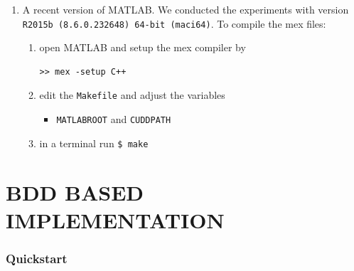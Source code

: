 \documentclass[a4paper]{amsart}
\begin{document}
\begin{enumerate}
  \item A recent version of MATLAB. We conducted
  the experiments with version {\tt \small R2015b (8.6.0.232648) 64-bit (maci64)}.
  To compile the mex files:
  \begin{enumerate}
    \item open MATLAB and setup the mex compiler by
  \begin{lstlisting}[basicstyle=\small\ttfamily,frame=none]
     >> mex -setup C++
  \end{lstlisting}
      \item edit the {\tt \small Makefile}  and adjust the variables
      \begin{itemize}
        \item {\tt \small MATLABROOT} and {\tt \small CUDDPATH}
      \end{itemize}
    \item in a terminal run
      {\tt \small \$ make}
  \end{enumerate}
\end{enumerate}
	

\part{BDD BASED IMPLEMENTATION}
  


\section{Quickstart}
\end{document}
